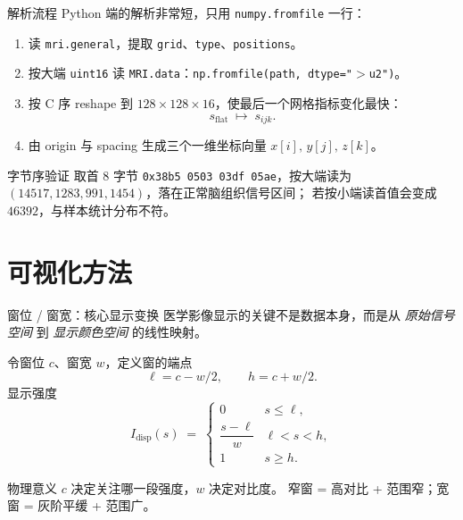 \documentclass[aspectratio=169,11pt]{ctexbeamer}
\begin{document}
\begin{frame}{解析流程}
  \small
  Python 端的解析非常短，只用 \texttt{numpy.fromfile} 一行：

  \begin{enumerate}
    \item 读 \texttt{mri.general}，提取 \texttt{grid}、\texttt{type}、\texttt{positions}。
    \item 按大端 \texttt{uint16} 读 \texttt{MRI.data}：\texttt{np.fromfile(path, dtype="$>$u2")}。
    \item 按 C 序 reshape 到 $128\times 128\times 16$，使最后一个网格指标变化最快：
      \[
        s_{\mathrm{flat}}\;\longmapsto\;s_{ijk}.
      \]
    \item 由 origin 与 spacing 生成三个一维坐标向量 $x[i],\,y[j],\,z[k]$。
  \end{enumerate}

  \begin{block}{字节序验证}
    取首 $8$ 字节 \texttt{0x38b5\,0503\,03df\,05ae}，按大端读为
    $(14517,1283,991,1454)$，落在正常脑组织信号区间；
    若按小端读首值会变成 $46392$，与样本统计分布不符。
  \end{block}
\end{frame}

\section{可视化方法}

\begin{frame}{窗位 / 窗宽：核心显示变换}
  \small
  医学影像显示的关键不是数据本身，而是从 \emph{原始信号空间} 到 \emph{显示颜色空间} 的线性映射。

  令窗位 $c$、窗宽 $w$，定义窗的端点
  \[
    \ell = c - w/2,\qquad
    h = c + w/2.
  \]
  显示强度
  \[
    I_{\text{disp}}(s) \;=\;
    \begin{cases}
      0 & s\le \ell,\\
      \dfrac{s-\ell}{w} & \ell<s<h,\\
      1 & s\ge h.
    \end{cases}
  \]

  \begin{block}{物理意义}
    $c$ 决定关注哪一段强度，$w$ 决定对比度。
    窄窗 = 高对比 + 范围窄；宽窗 = 灰阶平缓 + 范围广。
  \end{block}
\end{frame}
\end{document}
